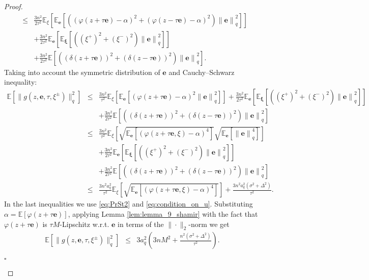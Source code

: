 \documentclass[runningheads]{llncs}
\newcommand{\EndProof}{\begin{flushright}$\square$\end{flushright}}
\begin{document}
\begin{proof}
\begin{eqnarray*}
  &\leq& \frac{3n^2}{2\tau^2}\mathbb{E}_{\xi}\left[\mathbb{E}_{\mathbf{e}}\left[\left(\left(\varphi(z + \tau \mathbf{e}) - \alpha\right)^2 + \left( \varphi(z - \tau \mathbf{e}) - \alpha\right)^2 \right)\left\|\mathbf{e}\right\|_q^2\right]\right] \nonumber\\
  &&+ \frac{3n^2}{2\tau^2}\mathbb{E}_{\mathbf{e}}\left[\mathbb{E}_{\mathbf{\xi}}\left[\left((\xi^+)^2 + (\xi^-)^2\right)\left\|\mathbf{e}\right\|_q^2\right]\right] \nonumber\\
  &&+ \frac{3n^2}{2\tau^2}\mathbb{E}\left[\left((\delta(z + \tau \mathbf{e}))^2+ (\delta(z - \tau \mathbf{e}))^2\right)\left\|\mathbf{e}\right\|_q^2\right] .
  \end{eqnarray*}
Taking into account the symmetric distribution of $\mathbf{e}$  and Cauchy--Schwarz inequality:
\begin{eqnarray*}
  \mathbb{E}\left[ \|g(z, \mathbf{e}, \tau,  \xi^{\pm})\|^2_q\right]
  &\leq& \frac{3n^2}{\tau^2}\mathbb{E}_{\xi}\left[\mathbb{E}_{\mathbf{e}}\left[\left(\varphi(z + \tau \mathbf{e}) - \alpha\right)^2 \left\|\mathbf{e}\right\|_q^2\right]\right] + \frac{3n^2}{2\tau^2}\mathbb{E}_{\mathbf{e}}\left[\mathbb{E}_{\mathbf{\xi}}\left[\left((\xi^+)^2 + (\xi^-)^2\right)\left\|\mathbf{e}\right\|_q^2\right]\right] \nonumber\\
  &&+ \frac{3n^2}{2\tau^2}\mathbb{E}\left[\left((\delta(z + \tau \mathbf{e}))^2+ (\delta(z - \tau \mathbf{e}))^2\right)\left\|\mathbf{e}\right\|_q^2\right] \nonumber\\
  &\leq& \frac{3n^2}{\tau^2}\mathbb{E}_{\xi}\left[\sqrt{\mathbb{E}_{\mathbf{e}}\left[\left(\varphi(z + \tau \mathbf{e},\xi) - \alpha\right)^4\right]} \sqrt{\mathbb{E}_{\mathbf{e}}\left[\left\|\mathbf{e}\right\|_q^4\right]}\right] \nonumber\\
  &&+ \frac{3n^2}{2\tau^2}\mathbb{E}_{\mathbf{e}}\left[\mathbb{E}_{\mathbf{\xi}}\left[\left((\xi^+)^2 + (\xi^-)^2\right)\left\|\mathbf{e}\right\|_q^2\right]\right] \nonumber\\
  &&+ \frac{3n^2}{2\tau^2}\mathbb{E}\left[\left((\delta(z + \tau \mathbf{e}))^2+ (\delta(z - \tau \mathbf{e}))^2\right)\left\|\mathbf{e}\right\|_q^2\right] \nonumber\\
  &\leq& \frac{3n^2 a_q^2}{\tau^2}\mathbb{E}_{\xi}\left[\sqrt{\mathbb{E}_{\mathbf{e}}\left[\left(\varphi(z + \tau \mathbf{e},\xi) - \alpha\right)^4\right]}\right] + \frac{3n^2 a_q^2 (\sigma^2 + \Delta^2)}{\tau^2}.
  \end{eqnarray*}  
In the last inequalities we use \eqref{eq:PrSt2} and \eqref{eq:condition_on_u}. Substituting $\alpha = \mathbb{E}\left[\varphi(z + \tau \mathbf{e})\right]$, applying Lemma \ref{lem:lemma_9_shamir} with the fact that $\varphi(z + \tau \mathbf{e})$ is $\tau M$-Lipschitz w.r.t. $\mathbf{e}$ in terms of the $\|\cdot\|_2$-norm we get
\begin{eqnarray*}
  \mathbb{E}\left[ \|g(z, \mathbf{e}, \tau,  \xi^{\pm})\|^2_q\right]
  &\leq& 3a_q^2 \left(3n M^2+ \frac{n^2(\sigma^2 + \Delta^2)}{\tau^2} \right).
  \end{eqnarray*}
\EndProof
\end{proof}
\end{document}
